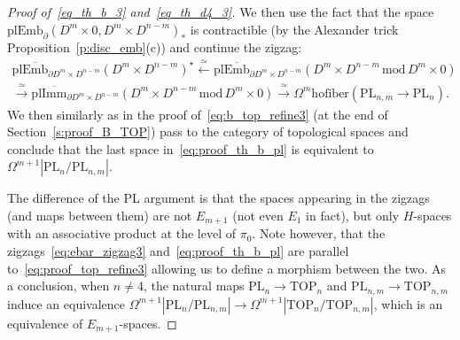 \documentclass[11pt]{amsart}
\theoremstyle{definition}
\newcommand{\Ebar}{\overline{\mathrm{Emb}}}
\newcommand{\Imm}{\mathrm{Imm}}
\newcommand{\plEmb}{\mathrm{plEmb}}
\newcommand{\PL}{\mathrm{PL}}
\newcommand{\TOP}{\mathrm{TOP}}
\newcommand{\mmod}{\,\mathrm{mod}\,}
\newcommand{\hofiber}{\mathrm{hofiber}}
\numberwithin{equation}{section}
\begin{document}
\begin{proof}[Proof of~\eqref{eq_th_b_3} and~\eqref{eq_th_d4_3}]
We then use the fact that the space   $\plEmb_\partial(D^m\times 0,D^m\times D^{n-m})_*$    is contractible (by the Alexander trick Proposition~\ref{p:disc_emb}(c)) and continue the zigzag:
\begin{multline}\label{eq:proof_th_b_pl}
\mathrm{pl}\Ebar_{\partial D^m\times D^{n-m}}(D^m\times D^{n-m})^\star\xleftarrow{\,\simeq\,}
\mathrm{pl}\Ebar_{\partial D^m\times D^{n-m}}(D^m\times D^{n-m}\mmod D^m\times 0)\\
\xrightarrow{\,\simeq\,}  %
\mathrm{pl}\overline{\Imm}_{\partial D^m\times D^{n-m}}(D^m\times D^{n-m}\mmod D^m\times 0)
\xrightarrow{\,\simeq\,} 
\Omega^m\hofiber\left(\PL_{n,m}\to\PL_n\right).
\end{multline}
We then similarly as in the proof of~\eqref{eq:b_top_refine3} (at the end of Section~\ref{s:proof_B_TOP}) pass to the 
category of topological spaces and conclude that the last space in~\eqref{eq:proof_th_b_pl} is equivalent
to $\Omega^{m+1}|\PL_n/\PL_{n,m}|$. 

The difference of the PL argument is that the spaces appearing in the zigzags (and maps between them) are not $E_{m+1}$
(not even $E_1$ in fact), but only $H$-spaces with an associative product at the level of $\pi_0$. Note however, that the 
zigzags~\eqref{eq:ebar_zigzag3} and~\eqref{eq:proof_th_b_pl} are parallel to~\eqref{eq:proof_top_refine3} allowing us to
define a morphism between the two. As a conclusion, when $n\neq 4$, the natural maps $\PL_n\to\TOP_n$ and $\PL_{n,m}\to\TOP_{n,m}$
induce an equivalence $\Omega^{m+1}|\PL_n/\PL_{n,m}|\to \Omega^{m+1}|\TOP_n/\TOP_{n,m}|$, which is an equivalence
of $E_{m+1}$-spaces.
\end{proof}
\end{document}
